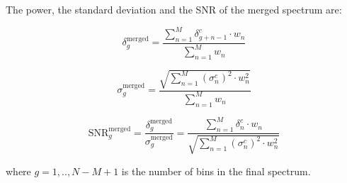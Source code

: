 The power, the standard deviation and the SNR of the merged spectrum are:


\begin{equation}
    \label{eq:merged_power}
    \delta_{g}^\text{merged} = \frac{ \sum_{n = 1}^{M}\delta_{g+n-1}^{c} \cdot {w_{n}}}{\sum_{n = 1}^{M} {w_{n}}}
\end{equation}

\begin{equation}
    \label{eq:merged_sigma}
    \sigma_{g}^\text{merged} =  \frac{ \sqrt{\sum_{n = 1}^{M} (\sigma_{n}^{c})^2 \cdot {w_{n}^2}}}{\sum_{n = 1}^{M} {w_{n}}}
\end{equation}

\begin{equation}
    \label{eq:merged_snr}
    \text{SNR}_{g}^\text{merged} = \frac{\delta^\text{merged}_{g}}{\sigma^\text{merged}_{g}} = \frac{\sum_{n = 1}^{M}\delta_{n}^{c} \cdot {w_{n}}}{ \sqrt{\sum_{n = 1}^{M} (\sigma_{n}^{c})^2 \cdot {w_{n}^2}}}
\end{equation}

where $g = 1,..,N-M+1$ is the number of bins in the final spectrum.




